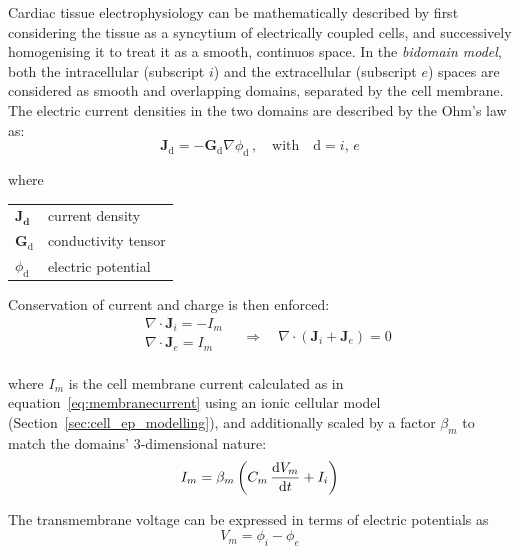 \vspace{0.2cm}
Cardiac tissue electrophysiology can be mathematically described by first considering the tissue as a syncytium of electrically coupled cells, and successively homogenising it to treat it as a smooth, continuos space. In the \textit{bidomain model}, both the intracellular (subscript $i$) and the extracellular (subscript $e$) spaces are considered as smooth and overlapping domains, separated by the cell membrane. The electric current densities in the two domains are described by the Ohm's law as:
%
\begin{equation}\label{eq:ohmslaw}
    \mathbf{J}_{\text{d}} = -\mathbf{G}_{\text{d}}\nabla\phi_{\text{d}}\,,\quad\text{with}\quad \text{d}=i,\,e
\end{equation}

\noindent
where

\vspace{0.2cm}
\begin{tabular}{ll}
    $\mathbf{\mathbf{J}_{\text{d}}}$ & current density \\
    $\mathbf{G}_{\text{d}}$ & conductivity tensor \\
    $\phi_{\text{d}}$ & electric potential \\
\end{tabular}

\vspace{0.2cm}\noindent
Conservation of current and charge is then enforced:
%
\begin{equation}
    \begin{aligned}
        & \nabla\cdot\mathbf{J}_i = -I_m \\
        & \nabla\cdot\mathbf{J}_e =  I_m \\
    \end{aligned}\quad\Rightarrow\quad \nabla\cdot(\mathbf{J}_i+\mathbf{J}_e) = 0
\end{equation}

\noindent
where $I_m$ is the cell membrane current calculated as in equation~\eqref{eq:membranecurrent} using an ionic cellular model (Section~\ref{sec:cell_ep_modelling}), and additionally scaled by a factor $\beta_m$ to match the domains' $3$-dimensional nature:
%
\begin{equation}\label{eq:membranecurrentsc}
    I_m = \beta_m\left(C_m\,\dfrac{\mathrm{d}{V_m}}{\mathrm{d}{t}} + I_i\right)
\end{equation}

\noindent
The transmembrane voltage can be expressed in terms of electric potentials as
%
\begin{equation}
    V_m = \phi_i - \phi_e
\end{equation}

